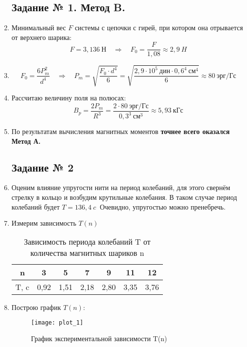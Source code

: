 \begin{enumerate}
\subsection*{Задание № 1. Метод B.}
\item  Минимальный вес $F$ системы с цепочки с гирей, при котором она отрывается от верхнего шарика: \\
\[
F = 3,136 \ Н \quad \Rightarrow \quad
F_0 = \frac{F}{1,08} \approx 2,9 \ H
\]
\item 
\[
F_0 = \frac{6 P_m^2}{d^4} \quad \Rightarrow \quad \boxed{P_m = \sqrt{\frac{F_0 \cdot d^4}{6}} = \sqrt{\frac{2,9 \cdot 10^5 \ дин \cdot 0,6^4 \ см^4 }{6}} \approx 80 \ эрг/Гс}
\]
\item Рассчитаю величину поля на полюсах: \\
\[
\boxed{B_p = \frac{2P_m}{R^3} = \frac{2 \cdot 80 \ эрг/Гс }{0,3^3 \ см^3} \approx 5,93 \ кГс}
\]
\item По результатам вычисления магнитных моментов \textbf{точнее всего оказался  \\ Метод А.}

\subsection*{Задание № 2}
\item Оценим влияние упругости нити на период колебаний, для этого свернём стрелку в кольцо и возбудим крутильные колебания. В таком случае период колебаний будет $T =  136,4 \ c \ $ Очевидно,  упругостью можно пренебречь.
\item Измерим зависимость $T(n)$

\begin{table}[!h]
	\centering
	\begin{tabular}{|c|c|c|c|c|c|c|}
		\hline
		n    & 3    & 5    & 7    & 9    & 11   & 12   \\ \hline
		T, c & 0,92 & 1,51 & 2,18 & 2,80 & 3,35 & 3,76 \\ \hline
	\end{tabular}
	\caption{Зависимость периода колебаний T от количества магнитных шариков n}
	\label{tab:table_1}
\end{table}

\item Построю график $T(n)$:
\begin{figure}[h!]
	\centering
	\texttt{[image: plot\_1]}
	\caption{График экспериментальной зависимости T(n)}
	\label{fig:plot_1}
\end{figure}



\end{enumerate}

